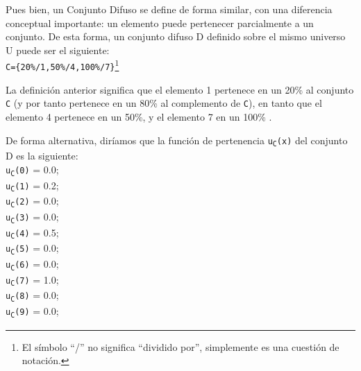 Pues bien, un Conjunto Difuso se define de forma similar, con una
diferencia conceptual importante: un elemento puede pertenecer
parcialmente a un conjunto. De esta forma, un conjunto difuso D definido
sobre el mismo universo U puede ser el siguiente:
\\ \newline
\null\hspace{0.59cm}\texttt{C=\{20\%/1,50\%/4,100\%/7\}}\footnote{El símbolo ``/'' no significa ``dividido por'', simplemente es una cuestión de notación.}

La definición anterior significa que el elemento 1 pertenece en un 20\% al
conjunto \texttt{C} (y por tanto pertenece en un 80\% al complemento de \texttt{C}), en tanto
que el elemento 4 pertenece en un 50\%, y el elemento 7 en un 100\% .

De forma alternativa, diríamos que la función de pertenencia \texttt{u\textsubscript{C}(x)} del
conjunto D es la siguiente:
\\ \newline
\null\hspace{0.59cm}\texttt{u\textsubscript{C}(0)} = 0.0;\\
\null\hspace{0.59cm}\texttt{u\textsubscript{C}(1)} = 0.2;\\
\null\hspace{0.59cm}\texttt{u\textsubscript{C}(2)} = 0.0;\\
\null\hspace{0.59cm}\texttt{u\textsubscript{C}(3)} = 0.0;\\
\null\hspace{0.59cm}\texttt{u\textsubscript{C}(4)} = 0.5;\\
\null\hspace{0.59cm}\texttt{u\textsubscript{C}(5)} = 0.0;\\
\null\hspace{0.59cm}\texttt{u\textsubscript{C}(6)} = 0.0;\\
\null\hspace{0.59cm}\texttt{u\textsubscript{C}(7)} = 1.0;\\
\null\hspace{0.59cm}\texttt{u\textsubscript{C}(8)} = 0.0;\\
\null\hspace{0.59cm}\texttt{u\textsubscript{C}(9)} = 0.0;

